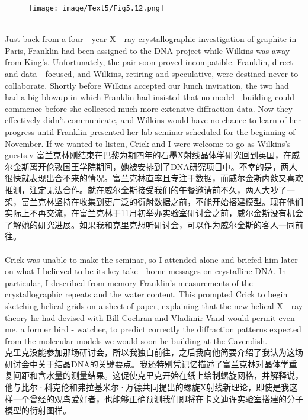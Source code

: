 \documentclass{article}
\begin{document}
\begin{figure}
    \centering
    \texttt{[image: image/Text5/Fig5.12.png]}
\end{figure}

\\
Just back from a four - year X - ray crystallographic investigation of graphite in Paris, Franklin had been assigned to the DNA project while Wilkins was away from King’s. Unfortunately, the pair soon proved incompatible. Franklin, direct and data - focused, and Wilkins, retiring and speculative, were destined never to collaborate. Shortly before Wilkins accepted our lunch invitation, the two had had a big blowup in which Franklin had insisted that no model - building could commence before she collected much more extensive diffraction data. Now they effectively didn’t communicate, and Wilkins would have no chance to learn of her progress until Franklin presented her lab seminar scheduled for the beginning of November. If we wanted to listen, Crick and I were welcome to go as Wilkins’s guests.v
富兰克林刚结束在巴黎为期四年的石墨X射线晶体学研究回到英国，在威尔金斯离开伦敦国王学院期间，她被安排到了DNA研究项目中。不幸的是，两人很快就表现出合不来的情况。富兰克林直率且专注于数据，而威尔金斯内敛又喜欢推测，注定无法合作。就在威尔金斯接受我们的午餐邀请前不久，两人大吵了一架，富兰克林坚持在收集到更广泛的衍射数据之前，不能开始搭建模型。现在他们实际上不再交流，在富兰克林于11月初举办实验室研讨会之前，威尔金斯没有机会了解她的研究进展。如果我和克里克想听研讨会，可以作为威尔金斯的客人一同前往。\\

\\
Crick was unable to make the seminar, so I attended alone and briefed him later on what I believed to be its key take - home messages on crystalline DNA. In particular, I described from memory Franklin’s measurements of the crystallographic repeats and the water content. This prompted Crick to begin sketching helical grids on a sheet of paper, explaining that the new helical X - ray theory he had devised with Bill Cochran and Vladimir Vand would permit even me, a former bird - watcher, to predict correctly the diffraction patterns expected from the molecular models we would soon be building at the Cavendish.\\
克里克没能参加那场研讨会，所以我独自前往，之后我向他简要介绍了我认为这场研讨会中关于结晶DNA的关键要点。我还特别凭记忆描述了富兰克林对晶体学重复间距和含水量的测量结果。这促使克里克开始在纸上绘制螺旋网格，并解释说，他与比尔·科克伦和弗拉基米尔·万德共同提出的螺旋X射线新理论，即使是我这样一个曾经的观鸟爱好者，也能够正确预测我们即将在卡文迪许实验室搭建的分子模型的衍射图样。\\
\end{document}
